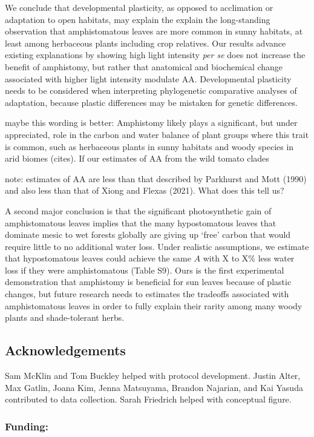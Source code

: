 \documentclass[
  letterpaper,
  DIV=11,
  numbers=noendperiod]{scrartcl}
\newcommand{\aax}{$\mathrm{AA}$}
\begin{document}
We conclude that developmental plasticity, as opposed to acclimation or
adaptation to open habitats, may explain the explain the long-standing
observation that amphistomatous leaves are more common in sunny
habitats, at least among herbaceous plants including crop relatives. Our
results advance existing explanations by showing high light intensity
\emph{per se} does not increase the benefit of amphistomy, but rather
that anatomical and biochemical change associated with higher light
intensity modulate \aax{}. Developmental plasticity needs to be
considered when interpreting phylogenetic comparative analyses of
adaptation, because plastic differences may be mistaken for genetic
differences.

maybe this wording is better: Amphistomy likely plays a significant, but
under appreciated, role in the carbon and water balance of plant groups
where this trait is common, such as herbaceous plants in sunny habitats
and woody species in arid biomes (cites). If our estimates of AA from
the wild tomato clades

note: estimates of AA are less than that described by Parkhurst and Mott
(1990) and also less than that of Xiong and Flexas (2021). What does
this tell us?

A second major conclusion is that the significant photosynthetic gain of
amphistomatous leaves implies that the many hypostomatous leaves that
dominate mesic to wet forests globally are giving up `free' carbon that
would require little to no additional water loss. Under realistic
assumptions, we estimate that hypostomatous leaves could achieve the
same \(A\) with X to X\% less water loss if they were amphistomatous
(Table S9). Ours is the first experimental demonstration that amphistomy
is beneficial for sun leaves because of plastic changes, but future
research needs to estimates the tradeoffs associated with amphistomatous
leaves in order to fully explain their rarity among many woody plants
and shade-tolerant herbs.

\subsection{Acknowledgements}\label{acknowledgements}

Sam McKlin and Tom Buckley helped with protocol development. Justin
Alter, Max Gatlin, Joana Kim, Jenna Matsuyama, Brandon Najarian, and Kai
Yasuda contributed to data collection. Sarah Friedrich helped with
conceptual figure.

\subsubsection{Funding:}\label{funding}
\end{document}
